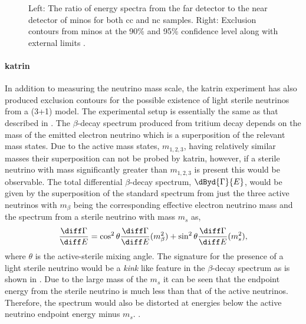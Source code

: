 \begin{figure}[h!]
    \caption[Ratio of energy spectra in the far and near detector of \gls{minos} plus exclusion contours ($\sin^2{\theta_{24}}$, $\Delta m^2_{41}$) space.]{Left: The ratio of energy spectra from the far detector to the near detector of \gls{minos} for both \gls{cc} and \gls{nc} samples. Right: Exclusion contours from \gls{minos} at the 90\% and 95\% confidence level along with external limits \cite{MINOS}.}
    \label{fig:minos_spectra_contour}
\end{figure}

\paragraph{\gls{katrin}}

In addition to measuring the neutrino mass scale, the \gls{katrin} experiment has also produced exclusion contours for the possible existence of light sterile neutrinos from a (3+1) model. The experimental setup is essentially the same as that described in . The $\beta$-decay spectrum produced from tritium decay depends on the mass of the emitted electron neutrino which is a superposition of the relevant mass states. Due to the active mass states, $m_{1,2,3}$, having relatively similar masses their superposition can not be probed by \gls{katrin}, however, if a sterile neutrino with mass significantly greater than $m_{1,2,3}$ is present this would be observable. The total differential $\beta$-decay spectrum, $\dByd{\Gamma}{E}$, would be given by the superposition of the standard spectrum from just the three active neutrinos with $m_{\beta}$ being the corresponding effective electron neutrino mass and the spectrum from a sterile neutrino with mass $m_s$ as, 
\begin{equation}
    \frac{\diff\Gamma}{\diff E} = \cos^2{\theta} \frac{\diff\Gamma}{\diff E}(m_{\beta}^2) + \sin^2{\theta} \frac{\diff\Gamma}{\diff E}(m_s^2),
\end{equation}
where $\theta$ is the active-sterile mixing angle. The signature for the presence of a light sterile neutrino would be a \textit{kink} like feature in the $\beta$-decay spectrum as is shown in . Due to the large mass of the $m_s$ it can be seen that the endpoint energy from the sterile neutrino is much less than that of the active neutrinos. Therefore, the spectrum would also be distorted at energies below the active neutrino endpoint energy minus $m_{s}$. \cite{A_novel_detector_system_for_KATRIN_to_search_for_keV_scale_sterile_neutrinos}.

